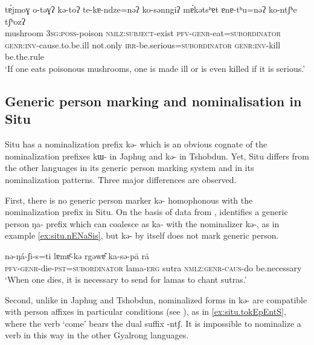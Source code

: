 \documentclass[oldfontcommands,oneside,a4paper,11pt]{article}
\newcommand{\ipa}[1]{{\phon \mbox{#1}}} %
\begin{document}
 \begin{exe}
\ex \label{ex:tshobdun.inv}
\gll
\ipa{tɐ́jmoɣ}  	\ipa{o-təɣʔ}  	\ipa{kə-toʔ}  	\ipa{te-kɐ-ndze=nəʔ}  	\ipa{ko-sənngiʔ}  	\ipa{mɐ́kətsʰɐt}  	\ipa{ɐnɐ-tʰu=nəʔ}  	\ipa{ko-ntʃʰe}  	\ipa{tʃʰozʔ}  \\
 mushroom \textsc{3sg:poss}-poison \textsc{nmlz:subject}-exist \textsc{pfv-genr}-eat=\textsc{subordinator}  \textsc{genr:inv}-cause.to.be.ill not.only \textsc{irr}-be.serious=\textsc{subordinator}   \textsc{genr:inv}-kill be.the.rule \\
\glt ‘If one eats poisonous mushrooms, one is made ill or is even killed if it is serious.’ 
 \end{exe}
 
 
\subsection{Generic person marking and nominalisation in Situ} \label{situ.nmlz}

   Situ has a nominalization prefix \ipa{kə-} which is an obvious cognate of the  nominalization prefixes \ipa{kɯ-} in Japhug and \ipa{kə-} in Tshobdun. Yet, Situ differs from the other languages in its generic person marking system and in its nominalization patterns. Three major differences are observed.

First, there is no generic person  marker \ipa{kə-} homophonous with the nominalization prefix in Situ.  On the basis of data from \citet[47-9]{wei01ka}, \citet[243-4]{sun14generic} identifies a generic person \ipa{ŋa-} prefix which can coalesce as \ipa{ka-} with the nominalizer \ipa{kə-}, as in example \ref{ex:situ.nENaSis}, but \ipa{kə-} by itself does not mark generic person. 

 \begin{exe}
\ex \label{ex:situ.nENaSis}
\gll
\ipa{nə-ŋá-ʃi-s=ti}  	\ipa{lɐmɐ̄-kə}  	\ipa{rgəwɐ̂}  	\ipa{ka-sə-pā}  	\ipa{rā}  \\
\textsc{pfv-genr}-die-\textsc{pst=subordinator} lama-\textsc{erg} sutra \textsc{nmlz:genr-caus}-do be.necessary \\
\glt `When one dies, it is necessary to send for lamas to chant sutras.'
  \end{exe}
 
Second, unlike in Japhug and Tshobdun, nominalized forms in \ipa{kə-} are compatible with person affixes in particular conditions (see \citealt[11-12]{jacksonlin07}), as in \ref{ex:situ.tokEpEntS}, where the verb `come' bears the dual suffix \ipa{-ntʃ}. It is impossible to nominalize a verb in this way in the other Gyalrong languages.
\end{document}
